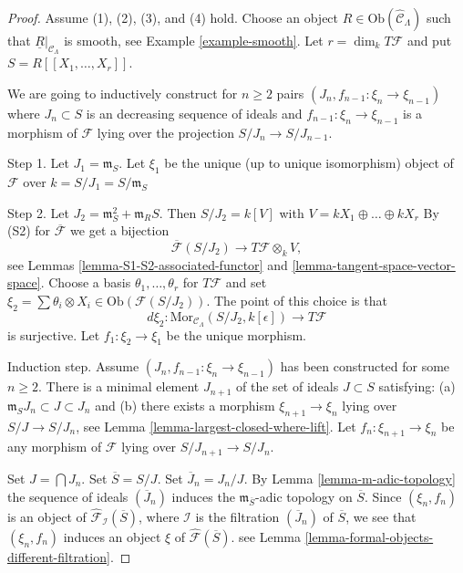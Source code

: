 \begin{proof}
Assume (1), (2), (3), and (4) hold. Choose an object
$R \in \text{Ob}(\widehat{\mathcal{C}}_\Lambda)$
such that $\underline{R}|_{\mathcal{C}_\Lambda}$ is smooth, see
Example \ref{example-smooth}.
Let $r = \dim_k T\mathcal{F}$ and put $S = R[[X_1, \dots, X_r]]$.

\medskip\noindent
We are going to inductively construct for $n \geq 2$ pairs
$(J_n, f_{n - 1} : \xi_{n} \to \xi_{n - 1})$
where $J_n \subset S$ is an decreasing sequence of ideals and
$f_{n - 1} : \xi_n \to \xi_{n - 1}$ is a morphism of
$\mathcal{F}$ lying over the projection $S/J_n \to S/J_{n - 1}$.

\medskip\noindent
Step 1. Let $J_1 = \mathfrak m_S$. Let $\xi_1$ be the unique
(up to unique isomorphism) object of $\mathcal{F}$ over
$k = S/J_1 = S/\mathfrak m_S$

\medskip \noindent
Step 2. Let
$J_2 = \mathfrak m_S^2 + \mathfrak{m}_R S$. Then
$S/J_2 = k[V]$ with $V = kX_1 \oplus \ldots \oplus kX_r$
By (S2) for $\overline{\mathcal{F}}$ we get a bijection
$$
\overline{\mathcal{F}}(S/J_2)
\longrightarrow
T\mathcal{F} \otimes_k V,
$$
see
Lemmas \ref{lemma-S1-S2-associated-functor} and
\ref{lemma-tangent-space-vector-space}.
Choose a basis $\theta_1, \dots, \theta_r$ for $T\mathcal{F}$ and set
$\xi_2 = \sum \theta_i \otimes X_i \in \text{Ob}(\mathcal{F}(S/J_2))$.
The point of this choice is that
$$
d\xi_2 :
\text{Mor}_{\mathcal{C}_\Lambda}(S/J_2, k[\epsilon])
\longrightarrow
T\mathcal{F}
$$
is surjective. Let $f_1 : \xi_2 \to \xi_1$ be the unique morphism.

\medskip \noindent
Induction step. Assume $(J_n, f_{n - 1} : \xi_n \to \xi_{n - 1})$ has been
constructed for some $n \geq 2$. There is a minimal element $J_{n + 1}$ of
the set of ideals $J \subset S$ satisfying:
(a) $\mathfrak m_S J_n \subset J \subset J_n$ and
(b) there exists a morphism $\xi_{n + 1} \to \xi_n$ lying over
$S/J \to S/J_n$, see
Lemma \ref{lemma-largest-closed-where-lift}.
Let $f_n : \xi_{n + 1} \to \xi_n$ be any morphism of $\mathcal{F}$
lying over $S/J_{n + 1} \to S/J_n$.

\medskip\noindent
Set $J = \bigcap J_n$. Set $\overline{S} = S/J$. Set $\overline{J}_n = J_n/J$.
By
Lemma \ref{lemma-m-adic-topology}
the sequence of ideals $(\overline{J}_n)$ induces the
$\mathfrak m_{\overline{S}}$-adic topology on $\overline{S}$.
Since $(\xi_n, f_n)$ is an object of 
$\widehat{\mathcal{F}}_{\mathcal{I}}(\overline{S})$, where $\mathcal{I}$
is the filtration $(\overline{J}_n)$ of $\overline{S}$,
we see that $(\xi_n, f_n)$
induces an object $\xi$ of $\widehat{\mathcal{F}}(\overline{S})$.
see
Lemma \ref{lemma-formal-objects-different-filtration}.


\end{proof}

